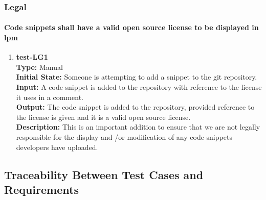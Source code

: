 \documentclass[12pt, titlepage]{article}
\begin{document}
\subsubsection{Legal}
\paragraph{Code snippets shall have a valid open source license to be displayed in lpm}
\begin{enumerate}
    \item{\textbf{test-LG1}\\}
    \textbf{Type:} Manual\\
    \textbf{Initial State:} Someone is attempting to add a snippet to the git repository. \\
    \textbf{Input:} A code snippet is added to the repository with reference to the license it uses in a comment. \\
    \textbf{Output:} The code snippet is added to the repository, provided reference to the license is given and it is a valid open source license.\\
    \textbf{Description:} This is an important addition to ensure that we are not legally responsible for the display and /or modification of any code snippets developers have uploaded.\\
\end{enumerate}


\subsection{Traceability Between Test Cases and Requirements}
\end{document}
